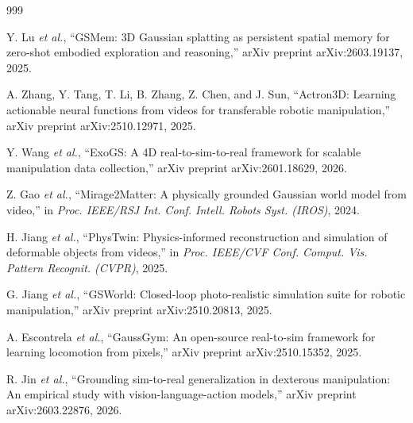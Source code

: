 \documentclass[11pt,a4paper]{article}
\begin{document}
\begin{thebibliography}{999}

Y. Lu \textit{et al.}, ``{GSMem}: {3D} Gaussian splatting as persistent spatial memory for zero-shot embodied exploration and reasoning,'' arXiv preprint arXiv:2603.19137, 2025.




A. Zhang, Y. Tang, T. Li, B. Zhang, Z. Chen, and J. Sun, ``{Actron3D}: Learning actionable neural functions from videos for transferable robotic manipulation,'' arXiv preprint arXiv:2510.12971, 2025.




Y. Wang \textit{et al.}, ``{ExoGS}: A {4D} real-to-sim-to-real framework for scalable manipulation data collection,'' arXiv preprint arXiv:2601.18629, 2026.




Z. Gao \textit{et al.}, ``Mirage2Matter: A physically grounded Gaussian world model from video,'' in \textit{Proc. IEEE/RSJ Int. Conf. Intell. Robots Syst. (IROS)}, 2024.




H. Jiang \textit{et al.}, ``PhysTwin: Physics-informed reconstruction and simulation of deformable objects from videos,'' in \textit{Proc. IEEE/CVF Conf. Comput. Vis. Pattern Recognit. (CVPR)}, 2025.




G. Jiang \textit{et al.}, ``{GSWorld}: Closed-loop photo-realistic simulation suite for robotic manipulation,'' arXiv preprint arXiv:2510.20813, 2025.




A. Escontrela \textit{et al.}, ``{GaussGym}: An open-source real-to-sim framework for learning locomotion from pixels,'' arXiv preprint arXiv:2510.15352, 2025.




R. Jin \textit{et al.}, ``Grounding sim-to-real generalization in dexterous manipulation: An empirical study with vision-language-action models,'' arXiv preprint arXiv:2603.22876, 2026.




\end{thebibliography}
\end{document}
